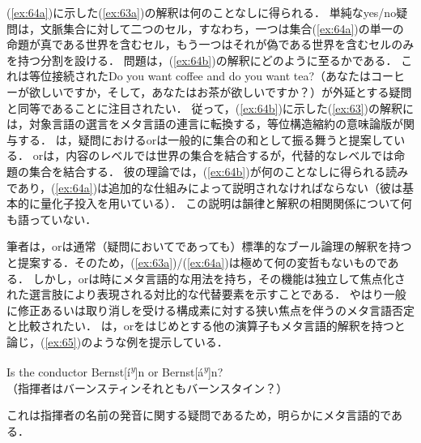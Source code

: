 \documentclass{goken}
\newcommand{\ori}[1]{\noindent\textcolor[gray]{0.7}{\fontsize{8pt}{8pt}\selectfont{\textsf{(p.~#1)}}} }
\begin{document}
\noindent
(\ref{ex:64a})に示した(\ref{ex:63a})の解釈は何のことなしに得られる．
単純なyes/no疑問は，文脈集合に対して二つのセル，すなわち，一つは集合(\ref{ex:64a})の単一の命題が真である世界を含むセル，もう一つはそれが偽である世界を含むセルのみを持つ分割を設ける．
問題は，(\ref{ex:64b})の解釈にどのように至るかである．
これは等位接続されたDo you want coffee and do you want tea?（あなたはコーヒーが欲しいですか，そして，あなたはお茶が欲しいですか？）が外延とする疑問と同等であることに注目されたい．
従って，(\ref{ex:64b})に示した(\ref{ex:63})の解釈には，対象言語の選言をメタ言語の連言に転換する，等位構造縮約の意味論版が関与する．
\citeauthor{vonStechow1991}は，疑問におけるorは一般的に集合の和として振る舞うと提案している．
orは，内容のレベルでは世界の集合を結合するが，代替的なレベルでは命題の集合を結合する．
彼の理論では，(\ref{ex:64b})が何のことなしに得られる読みであり，(\ref{ex:64a})は追加的な仕組みによって説明されなければならない（彼は基本的に量化子投入を用いている）．%
\ori{58}
この説明は韻律と解釈の相関関係について何も語っていない．

筆者は，orは通常（疑問においてであっても）標準的なブール論理の解釈を持つと提案する．そのため，(\ref{ex:63a})/(\ref{ex:64a})は極めて何の変哲もないものである．
しかし，orは時にメタ言語的な用法を持ち，その機能は独立して焦点化された選言肢により表現される対比的な代替要素を示すことである．
やはり一般に修正あるいは取り消しを受ける構成素に対する狭い焦点を伴う\citet{Horn1985,Horn1989}のメタ言語否定と比較されたい．
\citet[379ff]{Horn1989}は，orをはじめとする他の演算子もメタ言語的解釈を持つと論じ，(\ref{ex:65})のような例を提示している．

\begin{exe}
	\ex\label{ex:65}
  Is the conductor Bernst[\'i\textsuperscript{\textit{y}}]n or Bernst[\'a\textsuperscript{\textit{y}}]n?\\（指揮者はバーンスティンそれともバーンスタイン？）
\end{exe}

\noindent
これは指揮者の名前の発音に関する疑問であるため，明らかにメタ言語的である．
\end{document}
